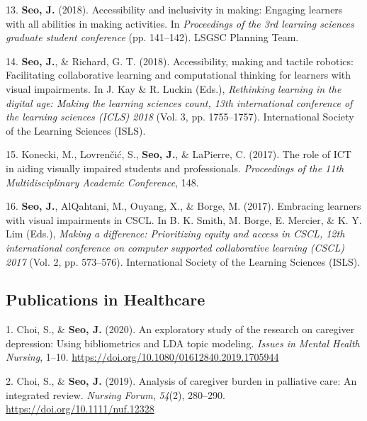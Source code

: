 \documentclass[11pt,a4paper,]{awesome-cv}
\begin{document}
\leavevmode{}%
13. \textbf{Seo, J.} (2018). Accessibility and inclusivity in making:
Engaging learners with all abilities in making activities. In
\emph{Proceedings of the 3rd learning sciences graduate student
conference} (pp. 141--142). LSGSC Planning Team.

\leavevmode{}%
14. \textbf{Seo, J.}, \& Richard, G. T. (2018). Accessibility, making
and tactile robotics: Facilitating collaborative learning and
computational thinking for learners with visual impairments. In J. Kay
\& R. Luckin (Eds.), \emph{Rethinking learning in the digital age:
Making the learning sciences count, 13th international conference of the
learning sciences (ICLS) 2018} (Vol. 3, pp. 1755--1757). International
Society of the Learning Sciences (ISLS).

\leavevmode{}%
15. Konecki, M., Lovrenčić, S., \textbf{Seo, J.}, \& LaPierre, C.
(2017). The role of ICT in aiding visually impaired students and
professionals. \emph{Proceedings of the 11th Multidisciplinary Academic
Conference}, 148.

\leavevmode{}%
16. \textbf{Seo, J.}, AlQahtani, M., Ouyang, X., \& Borge, M. (2017).
Embracing learners with visual impairments in CSCL. In B. K. Smith, M.
Borge, E. Mercier, \& K. Y. Lim (Eds.), \emph{Making a difference:
Prioritizing equity and access in CSCL, 12th international conference on
computer supported collaborative learning (CSCL) 2017} (Vol. 2, pp.
573--576). International Society of the Learning Sciences (ISLS).

\hypertarget{publications-in-healthcare}{%
\subsection{Publications in
Healthcare}\label{publications-in-healthcare}}

\hypertarget{bibliography}{}
\leavevmode{}%
1. Choi, S., \& \textbf{Seo, J.} (2020). An exploratory study of the
research on caregiver depression: Using bibliometrics and LDA topic
modeling. \emph{Issues in Mental Health Nursing}, 1--10.
\url{https://doi.org/10.1080/01612840.2019.1705944}

\leavevmode{}%
2. Choi, S., \& \textbf{Seo, J.} (2019). Analysis of caregiver burden in
palliative care: An integrated review. \emph{Nursing Forum},
\emph{54}(2), 280--290. \url{https://doi.org/10.1111/nuf.12328}
\end{document}
